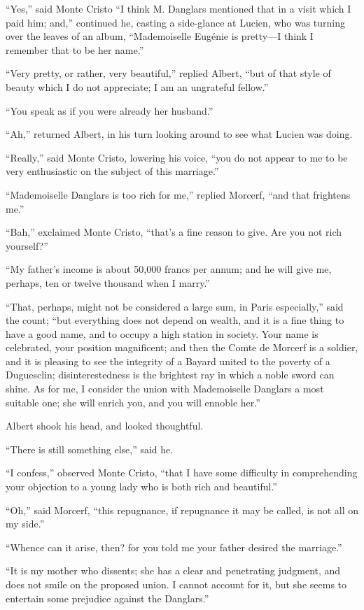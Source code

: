“Yes,” said Monte Cristo “I think M. Danglars mentioned that in a visit
which I paid him; and,” continued he, casting a side-glance at Lucien,
who was turning over the leaves of an album, “Mademoiselle Eugénie is
pretty—I think I remember that to be her name.”

“Very pretty, or rather, very beautiful,” replied Albert, “but of that
style of beauty which I do not appreciate; I am an ungrateful fellow.”

“You speak as if you were already her husband.”

“Ah,” returned Albert, in his turn looking around to see what Lucien
was doing.

“Really,” said Monte Cristo, lowering his voice, “you do not appear to
me to be very enthusiastic on the subject of this marriage.”

“Mademoiselle Danglars is too rich for me,” replied Morcerf, “and that
frightens me.”

“Bah,” exclaimed Monte Cristo, “that’s a fine reason to give. Are you
not rich yourself?”

“My father’s income is about 50,000 francs per annum; and he will give
me, perhaps, ten or twelve thousand when I marry.”

“That, perhaps, might not be considered a large sum, in Paris
especially,” said the count; “but everything does not depend on wealth,
and it is a fine thing to have a good name, and to occupy a high
station in society. Your name is celebrated, your position magnificent;
and then the Comte de Morcerf is a soldier, and it is pleasing to see
the integrity of a Bayard united to the poverty of a Duguesclin;
disinterestedness is the brightest ray in which a noble sword can
shine. As for me, I consider the union with Mademoiselle Danglars a
most suitable one; she will enrich you, and you will ennoble her.”

Albert shook his head, and looked thoughtful.

“There is still something else,” said he.

“I confess,” observed Monte Cristo, “that I have some difficulty in
comprehending your objection to a young lady who is both rich and
beautiful.”

“Oh,” said Morcerf, “this repugnance, if repugnance it may be called,
is not all on my side.”

“Whence can it arise, then? for you told me your father desired the
marriage.”

“It is my mother who dissents; she has a clear and penetrating
judgment, and does not smile on the proposed union. I cannot account
for it, but she seems to entertain some prejudice against the
Danglars.”

